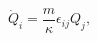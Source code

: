 \begin{equation}
     \dot{Q}_{i}=\frac{m}{\kappa}\epsilon_{ij}Q_{j},
     \label{Qeq}
\end{equation}

